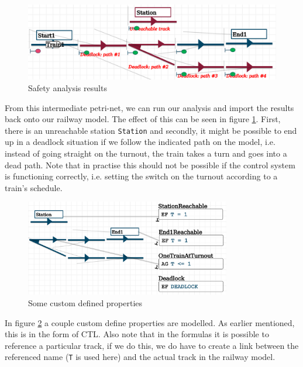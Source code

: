 \documentclass{article}
\begin{document}
\begin{figure}[H]
    \centering
    \includegraphics[width=\textwidth]{images/example_pn_results.png}
    \caption{Safety analysis results}
    \label{example_pn_results}
\end{figure}

From this intermediate petri-net, we can run our analysis and import the results back onto our railway model. The effect of this can be seen in figure \ref{example_pn_results}. First, there is an unreachable station \texttt{Station} and secondly, it might be possible to end up in a deadlock situation if we follow the indicated path on the model, i.e. instead of going straight on the turnout, the train takes a turn and goes into a dead path. Note that in practise this should not be possible if the control system is functioning correctly, i.e. setting the switch on the turnout according to a train's schedule.

\begin{figure}[H]
    \centering
    \includegraphics[width=0.8\textwidth]{images/custom_properties.png}
    \caption{Some custom defined properties}
    \label{custom_properties}
\end{figure}

In figure \ref{custom_properties} a couple custom define properties are modelled. As earlier mentioned, this is in the form of CTL. Also note that in the formulas it is possible to reference a particular track, if we do this, we do have to create a link between the referenced name (\texttt{T} is used here) and the actual track in the railway model.
\end{document}
